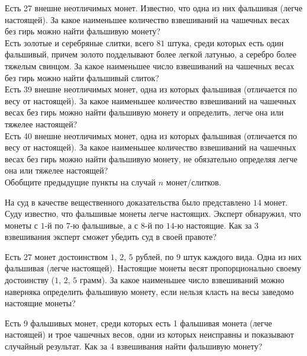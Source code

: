\begin{problems}
\item
\sbp
Есть 27 внешне неотличимых монет.
Известно, что одна из них фальшивая (легче настоящей).
За какое наименьшее количество взвешиваний на чашечных весах без гирь можно
найти фальшивую монету?
\\
\sbp
Есть золотые и серебряные слитки, всего $81$ штука, среди которых есть один
фальшивый, причем золото подделывают более легкой латунью, а серебро более
тяжелым свинцом.
За какое наименьшее число взвешиваний на чашечных весах без гирь можно найти
фальшивый слиток?
\\
\sbp
Есть 39 внешне неотличимых монет, одна из которых фальшивая
(отличается по весу от настоящей).
За какое наименьшее количество взвешиваний на чашечных весах без гирь можно
найти фальшивую монету и определить, легче она или тяжелее настоящей?
\\
\sbp
Есть 40 внешне неотличимых монет, одна из которых фальшивая
(отличается по весу от настоящей).
За какое наименьшее количество взвешиваний на чашечных весах без гирь можно
найти фальшивую монету, не обязательно определяя легче она или тяжелее
настоящей?
\\
\sbp Обобщите предыдущие пункты на случай $n$ монет/слитков.

\item
На суд в качестве вещественного доказательства было представлено $14$ монет.
Суду известно, что фальшивые монеты легче настоящих.
Эксперт обнаружил, что монеты с $1$-й по $7$-ю фальшивые, а с $8$-й по $14$-ю
настоящие.
Как за $3$ взвешивания эксперт сможет убедить суд в своей правоте?

\item
Есть $27$ монет достоинством $1$, $2$, $5$ рублей, по $9$ штук каждого вида.
Одна из них фальшивая (легче настоящей).
Настоящие монеты весят пропорционально своему достоинству
($1$, $2$, $5$ грамм).
За какое наименьшее число взвешиваний можно наверняка определить фальшивую
монету, если нельзя класть на весы заведомо настоящие монеты?

\item
Есть 9 фальшивых монет, среди которых есть 1 фальшивая монета (легче настоящей)
и трое чашечных весов, одни из которых неисправны и показывают случайный
результат.
Как за 4 взвешивания найти фальшивую монету?

\end{problems}

